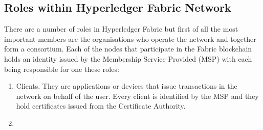 \subsection{Roles within Hyperledger Fabric Network}
There are a number of roles in Hyperledger Fabric but first of all the most important members are the organisations who operate the network and together form a consortium.
Each of the nodes that participate in the Fabric blockchain holds an identity issued by the Membership Service Provided (MSP) with each being responsible for one these roles:
\begin{enumerate}
  \item Clients. They are applications or devices that issue transactions in the network on behalf of the user. Every client is identified by the MSP and they hold certificates issued from the Certificate Authority. 
  \item 
\end{enumerate}




